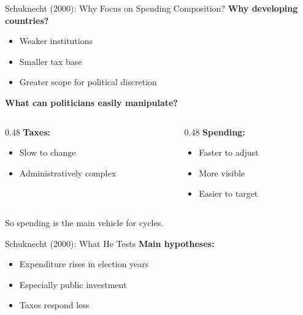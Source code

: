 \documentclass[10pt]{beamer}
\begin{document}
\begin{frame}{Schuknecht (2000): Why Focus on Spending Composition?}
\textbf{Why developing countries?}
\begin{itemize}
\item Weaker institutions
\item Smaller tax base
\item Greater scope for political discretion
\end{itemize}

\vspace{0.3cm}
\textbf{What can politicians easily manipulate?}

\begin{columns}
\begin{column}{0.48\textwidth}
\textbf{Taxes:}
\begin{itemize}
\item Slow to change
\item Administratively complex
\end{itemize}
\end{column}

\begin{column}{0.48\textwidth}
\textbf{Spending:}
\begin{itemize}
\item Faster to adjust
\item More visible
\item Easier to target
\end{itemize}
\end{column}
\end{columns}

\vspace{0.3cm}
\alert{So spending is the main vehicle for cycles.}
\end{frame}

\begin{frame}{Schuknecht (2000): What He Tests}
\textbf{Main hypotheses:}

\begin{itemize}
\item Expenditure rises in election years
\item Especially public investment
\item Taxes respond less
\end{itemize}
\end{frame}
\end{document}
